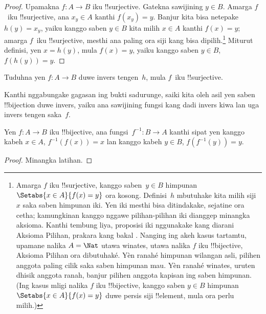 \documentclass[../../../include/open-logic-section]{subfiles}
\begin{document}
\begin{proof}
Upamakna $f\colon A \to B$ iku !!{surjective}. Gatekna sawijining $y \in
B$. Amarga $f$~iku !!{surjective}, ana $x_y \in A$ kanthi $f(x_y)
= y$. Banjur kita bisa netepake $h(y) = x_y$, yaiku kanggo saben $y \in B$
kita milih $x \in A$ kanthi $f(x) = y$; amarga $f$~iku !!{surjective},
mesthi ana paling ora siji kang bisa dipilih.\footnote{Amarga $f$ iku
!!{surjective}, kanggo saben~$y \in B$ himpunan $\Setabs{x \in A}{f(x) = y}$
ora kosong. Definisi~$h$ mbutuhake kita milih siji $x$
saka saben himpunan iki. Yen iki mesthi bisa ditindakake, sejatine ora
cetha; kamungkinan kanggo nggawe pilihan-pilihan iki dianggep minangka aksioma.
Kanthi tembung liya, proposisi iki nggunakake kang diarani Aksioma
Pilihan, prakara kang bakal .
Nanging ing akeh kasus tartamtu, upamane nalika $A = \Nat$ utawa winates, utawa nalika $f$ iku !!{bijective},
Aksioma Pilihan ora dibutuhaké. Yèn ranahé himpunan wilangan asli,
pilihen anggota paling cilik saka saben himpunan mau. Yèn ranahé winates,
uruten dhisik anggota ranah, banjur pilihen anggota kapisan ing saben himpunan.
(Ing kasus mligi nalika $f$ iku !!{bijective}, kanggo saben $y \in B$ himpunan
$\Setabs{x \in A}{f(x) = y}$ duwe persis siji !!{element}, mula ora perlu milih.)}
Miturut definisi, yen $x = h(y)$,
mula $f(x) = y$, yaiku kanggo saben $y \in B$, $f(h(y)) = y$.
\end{proof}

\begin{prob}
Tuduhna yen $f\colon A \to B$ duwe invers tengen~$h$, mula $f$~iku
!!{surjective}.
\end{prob}

\begin{explain}
  Kanthi nggabungake gagasan ing bukti sadurunge, saiki kita oleh asil yen saben
  !!{bijection} duwe invers, yaiku ana sawijining fungsi
  kang dadi invers kiwa lan uga invers tengen saka~$f$.
\end{explain}

\begin{prop}
Yen $f\colon A \to B$ iku !!{bijective}, ana
fungsi~$f^{-1}\colon B \to A$ kanthi sipat yen kanggo kabeh $x \in A$,
$f^{-1}(f(x)) = x$ lan kanggo kabeh $y \in B$, $f(f^{-1}(y)) = y$.
\end{prop}

\begin{proof}
Minangka latihan.
\end{proof}
\end{document}
